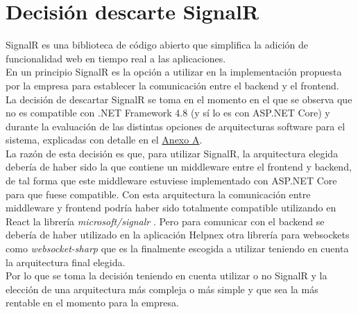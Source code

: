\chapter{Decisión descarte SignalR}
\label{anexo-b}


SignalR \cite{signalr} es una biblioteca de código abierto que simplifica la adición de funcionalidad web en tiempo real a las aplicaciones.\\

En un principio SignalR es la opción a utilizar en la implementación propuesta por la empresa  para establecer la comunicación entre el backend y el frontend.\\

La decisión de descartar SignalR se toma en el momento en el que se observa que no es compatible con .NET Framework 4.8 (y sí lo es con ASP.NET Core) y durante la evaluación de las distintas opciones de arquitecturas software para el sistema, explicadas con detalle en el \hyperref[anexo-a]{Anexo A}.\\

La razón de esta decisión es que, para utilizar SignalR, la arquitectura elegida debería de haber sido la que contiene un middleware entre el frontend y backend, de tal forma que este middleware estuviese implementado con ASP.NET Core para que fuese compatible.
Con esta arquitectura la comunicación entre middleware y frontend podría haber sido totalmente compatible utilizando en React la librería \textit{microsoft/signalr} \cite{microsoft/signalr}. Pero para comunicar con el backend se debería de haber utilizado en la aplicación Helpnex otra librería para websockets como \textit{websocket-sharp} \cite{websocket-sharp} que es la finalmente escogida a utilizar teniendo en cuenta la arquitectura final elegida.\\

Por lo que se toma la decisión teniendo en cuenta utilizar o no SignalR y la elección de una arquitectura más compleja o más simple y que sea la más rentable en el momento para la empresa.
